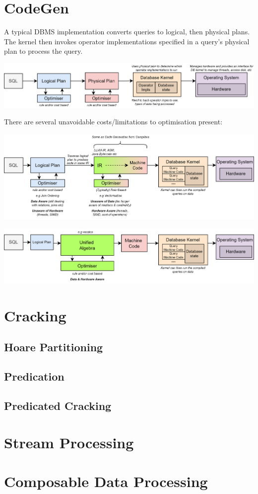 \section{CodeGen}
A typical DBMS implementation converts queries to logical, then physical plans. The kernel then invokes operator implementations specified in a query's physical plan to process the query. 
\begin{center}
    \includegraphics[width=\textwidth]{advanced_topics/images/naive_query_path.drawio.png}
\end{center}
There are several unavoidable costs/limitations to optimisation present:
\unfinished
\begin{center}
    \includegraphics[width=\textwidth]{advanced_topics/images/query_compilation_path.drawio.png}
\end{center}
\begin{center}
    \includegraphics[width=\textwidth]{advanced_topics/images/unified_algebra_path.drawio.png}
\end{center}





\section{Cracking}
\subsection{Hoare Partitioning}
\subsection{Predication}
\subsection{Predicated Cracking}
\section{Stream Processing}
\section{Composable Data Processing}

